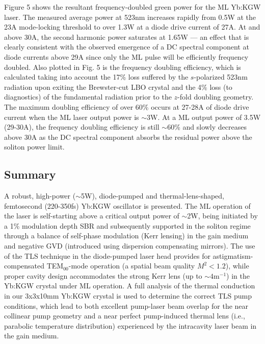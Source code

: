 Figure 5 shows the resultant frequency-doubled green power for the ML Yb:KGW laser.
The measured average power at 523nm increases rapidly from 0.5W at the 23A mode-locking threshold to over 1.3W at a diode drive current of 27A.
At and above 30A, the second harmonic power saturates at 1.65W --- an effect that is clearly consistent with the observed emergence of a DC spectral component at diode currents above 29A since only the ML pulse will be efficiently frequency doubled.
Also plotted in Fig. 5 is the frequency doubling efficiency, which is calculated taking into account the 17\% loss suffered by the $s$-polarized 523nm radiation upon exiting the Brewster-cut LBO crystal and the 4\% loss (to diagnostics) of the fundamental radiation prior to the $z$-fold doubling geometry.
The maximum doubling efficiency of over 60\% occurs at 27-28A of diode drive current when the ML laser output power is $\sim$3W.
At a ML output power of 3.5W (29-30A), the frequency doubling efficiency is still $\sim$60\% and slowly decreases above 30A as the DC spectral component absorbs the residual power above the soliton power limit.

\subsection{Summary}


A robust, high-power ($\sim$5W), diode-pumped and thermal-lens-shaped, femtosecond (220-350fs) Yb:KGW oscillator is presented.
The ML operation of the laser is self-starting above a critical output power of $\sim$2W, being initiated by a 1\% modulation depth SBR and subsequently supported in the soliton regime through a balance of self-phase modulation (Kerr lensing) in the gain medium and negative GVD (introduced using dispersion compensating mirrors).
The use of the TLS technique in the diode-pumped laser head provides for astigmatism-compensated TEM$_{00}$-mode operation (a spatial beam quality $M^2 <1.2$), while proper cavity design accommodates the strong Kerr lens (up to $\sim4\text{m}^{-1}$) in the Yb:KGW crystal under ML operation.
A full analysis of the thermal conduction in our 3x3x10mm Yb:KGW crystal is used to determine the correct TLS pump conditions, which lead to both excellent pump-laser beam overlap for the near collinear pump geometry and a near perfect pump-induced thermal lens (i.e., parabolic temperature distribution) experienced by the intracavity laser beam in the gain medium.

